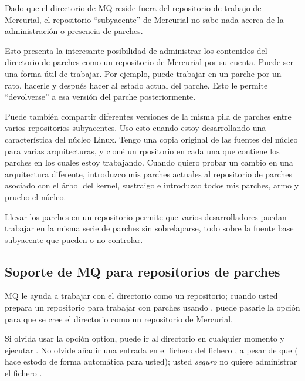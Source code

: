 Dado que el directorio  de MQ reside fuera del
repositorio de trabajo de Mercurial, el repositorio ``subyacente'' de
Mercurial no sabe nada acerca de la administración o presencia de
parches.

Esto presenta la interesante posibilidad de administrar los contenidos
del directorio de parches como un repositorio de Mercurial por su
cuenta.  Puede ser una forma útil de trabajar.  Por ejemplo, puede
trabajar en un parche por un rato, hacerle  y
después hacer  al estado actual del parche.  Esto le
permite ``devolverse'' a esa versión del parche posteriormente.

Puede también compartir diferentes versiones de la misma pila de
parches entre varios repositorios subyacentes.  Uso esto cuando estoy
desarrollando una característica del núcleo Linux.  Tengo una copia
original de las fuentes del núcleo para varias arquitecturas, y cloné
un rpositorio en cada una que contiene los parches en los cuales
estoy trabajando.  Cuando quiero probar un cambio en una arquitectura
diferente, introduzco mis parches actuales al repositorio de parches
asociado con el árbol del kernel, sustraigo e introduzco todos mis
parches, armo y pruebo el núcleo.

Llevar los parches en un repositorio permite que varios
desarrolladores puedan trabajar en la misma serie de parches sin
sobrelaparse, todo sobre la fuente base subyacente que pueden o no
controlar.

\subsection{Soporte de MQ para repositorios de parches}

MQ le ayuda a trabajar con el directorio  como
un repositorio; cuando usted prepara un repositorio para trabajar con
parches usando , puede pasarle la opción
 para que se cree el directorio
 como un repositorio de Mercurial.

\begin{note}
  Si olvida usar la opción  option, puede ir al
  directorio  en cualquier momento y ejecutar
  .  No olvide añadir una entrada en el fichero
   del fichero , a pesar de que
  ( hace estodo de forma
  automática para usted); usted \emph{seguro} no quiere administrar el
  fichero .
\end{note}

